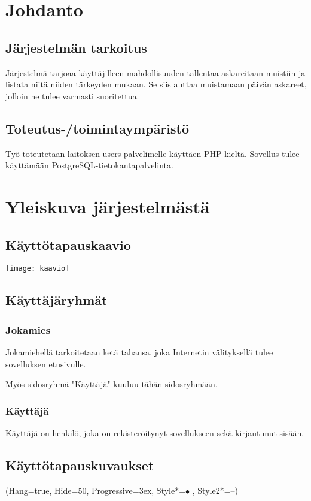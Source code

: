 \documentclass{report}
\begin{document}
\section*{Johdanto}
\subsection*{Järjestelmän tarkoitus}
Järjestelmä tarjoaa käyttäjilleen mahdollisuuden tallentaa askareitaan muistiin ja listata niitä niiden tärkeyden mukaan. Se siis auttaa muistamaan päivän askareet, jolloin ne tulee varmasti suoritettua.

\subsection*{Toteutus-/toimintaympäristö}
Työ toteutetaan laitoksen users-palvelimelle käyttäen PHP-kieltä. Sovellus tulee käyttämään PostgreSQL-tietokantapalvelinta.

\section*{Yleiskuva järjestelmästä}
\subsection*{Käyttötapauskaavio}
\texttt{[image: kaavio]}

\subsection*{Käyttäjäryhmät}
\subsubsection*{Jokamies}
Jokamiehellä tarkoitetaan ketä tahansa, joka Internetin välityksellä tulee sovelluksen etusivulle. 

Myös sidosryhmä "Käyttäjä" kuuluu tähän sidosryhmään.

\subsubsection*{Käyttäjä}
Käyttäjä on henkilö, joka on rekisteröitynyt sovellukseen sekä kirjautunut sisään.

\subsection*{Käyttötapauskuvaukset}
\ListProperties(Hang=true, Hide=50, Progressive=3ex, Style*=$\bullet$ , Style2*=--)
\end{document}

